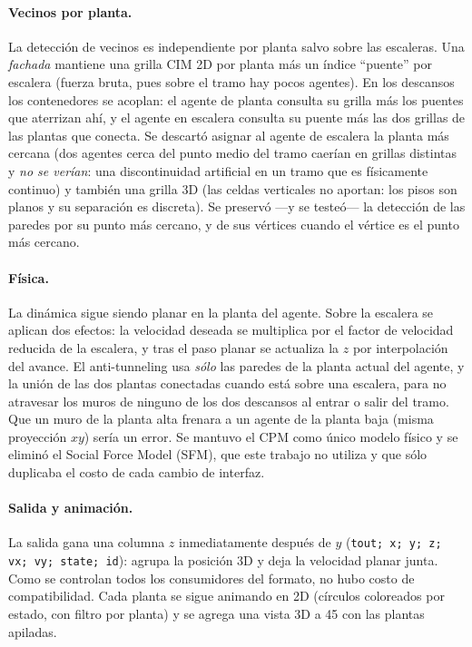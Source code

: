 \documentclass[11pt,a4paper]{article}
\begin{document}
\paragraph{Vecinos por planta.}
La detección de vecinos es independiente por planta salvo sobre las escaleras. Una \emph{fachada}
mantiene una grilla CIM 2D por planta más un índice ``puente'' por escalera (fuerza bruta, pues
sobre el tramo hay pocos agentes). En los descansos los contenedores se acoplan: el agente de
planta consulta su grilla más los puentes que aterrizan ahí, y el agente en escalera consulta su
puente más las dos grillas de las plantas que conecta. Se descartó asignar al agente de escalera
la planta más cercana (dos agentes cerca del punto medio del tramo caerían en grillas distintas y
\emph{no se verían}: una discontinuidad artificial en un tramo que es físicamente continuo) y
también una
grilla 3D (las celdas verticales no aportan: los pisos son planos y su separación es discreta). Se
preservó ---y se testeó--- la detección de las paredes por su punto más cercano, y de sus vértices
cuando el vértice es el punto más cercano.

\paragraph{Física.}
La dinámica sigue siendo planar en la planta del agente. Sobre la escalera se aplican dos efectos:
la velocidad deseada se multiplica por el factor de velocidad reducida de la escalera, y tras el
paso planar se actualiza la $z$ por interpolación del avance. El anti-tunneling usa \emph{sólo} las
paredes de la planta actual del agente, y la unión de las dos plantas conectadas cuando está sobre
una escalera, para no atravesar los muros de ninguno de los dos descansos al entrar o salir del
tramo. Que un muro de la planta alta frenara a un agente de la planta baja (misma proyección $xy$)
sería un error. Se mantuvo el CPM como único modelo físico y se eliminó el Social Force Model
(SFM), que este trabajo no utiliza y que sólo duplicaba el costo de cada cambio de interfaz.

\paragraph{Salida y animación.}
La salida gana una columna $z$ inmediatamente después de $y$
(\texttt{tout; x; y; z; vx; vy; state; id}): agrupa la posición 3D y deja la velocidad planar
junta. Como se controlan todos los consumidores del formato, no hubo costo de compatibilidad. Cada
planta se sigue animando en 2D (círculos coloreados por estado, con filtro por planta) y se agrega
una vista 3D a 45\textdegree{} con las plantas apiladas.
\end{document}
